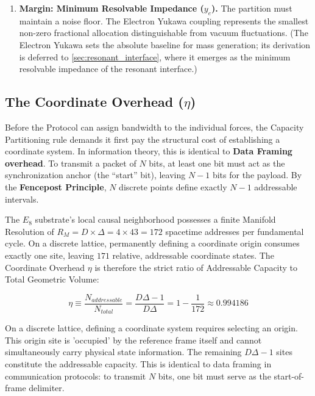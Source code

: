 \begin{enumerate}
    \item \textbf{Margin: Minimum Resolvable Impedance ($y_e$).} 
    The partition must maintain a noise floor. The Electron Yukawa coupling represents the smallest non-zero fractional allocation distinguishable from vacuum fluctuations. (The Electron Yukawa sets the absolute baseline for mass generation; its derivation is deferred to \cref{sec:resonant_interface}, where it emerges as the minimum resolvable impedance of the resonant interface.)
\end{enumerate}

\subsection{The Coordinate Overhead (\texorpdfstring{$\eta$}{eta})}

Before the Protocol can assign bandwidth to the individual forces, the Capacity Partitioning rule demands it first pay the structural cost of establishing a coordinate system. In information theory, this is identical to \textbf{Data Framing overhead}. To transmit a packet of $N$ bits, at least one bit must act as the synchronization anchor (the ``start'' bit), leaving $N-1$ bits for the payload. By the \textbf{Fencepost Principle}, $N$ discrete points define exactly $N-1$ addressable intervals.

The $E_8$ substrate's local causal neighborhood possesses a finite Manifold Resolution of $R_M = D \times \Delta = 4 \times 43 = 172$ spacetime addresses per fundamental cycle. On a discrete lattice, permanently defining a coordinate origin consumes exactly one site, leaving $171$ relative, addressable coordinate states. The Coordinate Overhead $\eta$ is therefore the strict ratio of Addressable Capacity to Total Geometric Volume:

\begin{equation}
\label{eq:coordinate_overhead}
\eta \equiv \frac{N_{addressable}}{N_{total}} = \frac{D\Delta - 1}{D\Delta} = 1 - \frac{1}{172} \approx 0.994186
\end{equation}

On a discrete lattice, defining a coordinate system requires selecting an origin. This origin site is 'occupied' by the reference frame itself and cannot simultaneously carry physical state information. The remaining $D\Delta - 1$ sites constitute the addressable capacity. This is identical to data framing in communication protocols: to transmit $N$ bits, one bit must serve as the start-of-frame delimiter.

